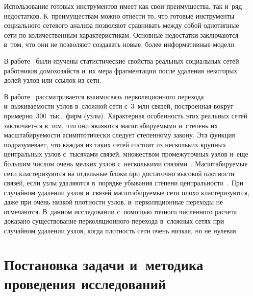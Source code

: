 \begin{multicols}{2}
  Использование готовых инструментов имеет как свои преимущества, так 
и~ряд недостатков. К~преимуществам можно отнести то, что готовые 
инструменты социального сетевого анализа поз\-во\-ля\-ют сравнивать между собой 
 однотипные сети
по количественным характеристикам. Основные недостатки 
заключаются в~том, что они не позволяют создавать новые, более 
информативные модели. 
  
  В работе~\cite{8-zh} были изучены статистические свойства реальных 
социальных сетей работников домохозяйств и~их мера фрагментации после 
удаления некоторых долей узлов или ссылок из сети. 
  
  В работе~\cite{9-zh} рас\-смат\-ри\-ва\-ет\-ся взаимосвязь перколяционного перехода 
и~выживаемости узлов в~сложной сети с~3~млн связей, по\-стро\-ен\-ная 
вокруг примерно~300~тыс.\ фирм (узлы). Характер\-ная особенность этих 
реальных сетей за\-клю\-ча\-ет-\linebreak ся в~том, что они являются мас\-шта\-би\-ру\-емы\-ми\linebreak 
и~степень их мас\-шта\-би\-ру\-емости асимптотически следует степенному закону. 
Эта функ\-ция под\-разуме\-ва\-ет, что каждая из таких сетей со\-сто\-ит из нескольких 
крупных цент\-раль\-ных узлов с~тысячами связей, мно\-же\-ст\-вом промежуточных 
узлов и~еще б$\acute{\mbox{о}}$льшим числом очень мелких узлов 
с~несколькими связями~\cite{10-zh}. Масштабируемые сети кластеризуются на 
отдельные блоки при достаточно высокой плот\-ности связей, если узлы 
удаляются в~порядке убывания степени цент\-раль\-ности~\cite{11-zh}. При 
случайном удалении узлов и~связей мас\-шта\-би\-ру\-емые сети плохо 
клас\-те\-ри\-зу\-ют\-ся, даже при очень низкой плот\-ности узлов, и~перколяционные 
переходы не отмечаются. В~данном исследовании с~по\-мощью 
точного чис\-лен\-но\-го расчета~\cite{9-zh} доказано существование перколяционного 
перехода в~сложных сетях при случайном удалении узлов, когда плот\-ность сети 
очень низкая, но не нулевая. 

\vspace*{-6pt}
     
\section{Постановка задачи и~методика проведения исследований}


\end{multicols}

